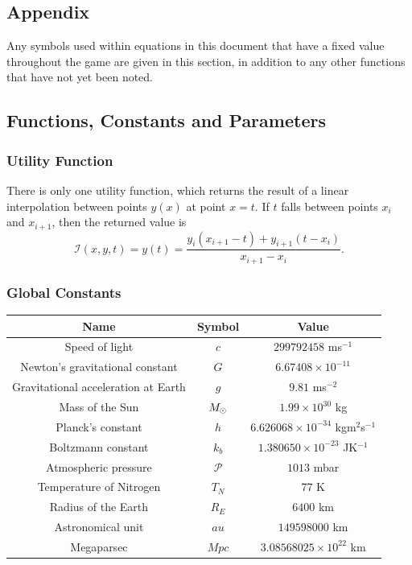 \documentclass{article}
\begin{document}
\begin{appendix}
\section{Appendix}
Any symbols used within equations in this document that have a fixed
value throughout the game are given in this section, in addition to
any other functions that have not yet been noted.
\subsection{Functions, Constants and Parameters}
\subsubsection*{Utility Function}
There is only one utility function, which returns the result of a
linear interpolation between points $y(x)$ at point $x = t$. If $t$
falls between points $x_i$ and $x_{i+1}$, then the returned value is
\begin{equation}
    \mathcal{I}(x, y, t) = y(t) = \frac{y_i(x_{i+1} - t) + y_{i+1}(t - x_i)}{x_{i+1} - x_i}.
    \label{eq:lerp}
\end{equation}
\subsubsection*{Global Constants}
\label{sec:constants}
\begin{center}
    \begin{tabular}{ |c|c|c| } 
     \hline
     \textbf{Name} & \textbf{Symbol}  & \textbf{Value}\\     
     \hline
     Speed of light  & $c$ & $299792458$ ms$^{-1}$\\ 
     \hline
     Newton's gravitational constant  & $G$ & $6.67408 \times 10^{-11}$\\ 
     \hline
     Gravitational acceleration at Earth  & $g$ & $9.81$ ms$^{-2}$\\ 
     \hline
     Mass of the Sun  & $M_{\rm \odot}$ & $1.99 \times 10^{30}$ kg\\ 
     \hline
     Planck's constant  & $h$  & $6.626068 \times 10^{-34}$ kgm$^2$s$^{-1}$\\ 
     \hline
    Boltzmann constant  & $k_b$  & $1.380650 \times 10^{-23}$ JK$^{-1}$\\ 
    \hline
    Atmospheric pressure  & $\mathcal{P}$  & $1013$ mbar\\ 
    \hline
    Temperature of Nitrogen  & $T_N$  & $77$ K\\ 
    \hline
    Radius of the Earth & $R_E$ &  $6400$ km\\ 
    \hline
    Astronomical unit & $au$ &  $149598000$ km\\ 
    \hline
    Megaparsec & $Mpc$ & $3.08568025 \times 10^{22}$ km\\ 
    \hline
    \end{tabular}
\end{center}


\end{appendix}
\end{document}
